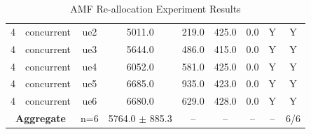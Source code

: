 \begin{table}[ht]
\begin{tabular}{|c|c|c|c|c|c|c|c|c|}
4 & concurrent & ue2 & 5011.0 & 219.0 & 425.0 & 0.0 & Y & Y \\
4 & concurrent & ue3 & 5644.0 & 486.0 & 415.0 & 0.0 & Y & Y \\
4 & concurrent & ue4 & 6052.0 & 581.0 & 425.0 & 0.0 & Y & Y \\
4 & concurrent & ue5 & 6685.0 & 935.0 & 423.0 & 0.0 & Y & Y \\
4 & concurrent & ue6 & 6680.0 & 629.0 & 428.0 & 0.0 & Y & Y \\
\multicolumn{2}{|c|}{\textbf{Aggregate}} & n=6 & 5764.0 $\pm$ 885.3 & -- & -- & -- & -- & 6/6 \\
\hline
\end{tabular}
\caption{AMF Re-allocation Experiment Results}
\label{tab:amf_realloc}
\end{table}

